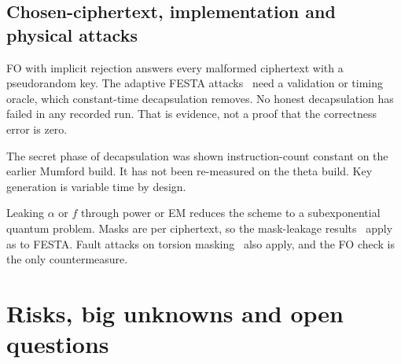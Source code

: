 \documentclass[11pt,a4paper]{article}
\begin{document}
\subsection{Chosen-ciphertext, implementation and physical attacks}
\begin{description}[style=nextline]
\item[Adaptive and decryption-failure attacks (derived).] FO with implicit
  rejection answers every malformed ciphertext with a pseudorandom key. The
  adaptive FESTA attacks~\cite{MO23} need a validation or timing oracle,
  which constant-time decapsulation removes. No honest decapsulation has
  failed in any recorded run. That is evidence, not a proof that the
  correctness error is zero.
\item[Timing (partly measured).] The secret phase of decapsulation was
  shown instruction-count constant on the earlier Mumford build. It has not
  been re-measured on the theta build. Key generation is variable time by
  design.
\item[Side channels beyond timing (open).] Leaking $\alpha$ or $f$ through
  power or EM reduces the scheme to a subexponential quantum problem.
  Masks are per ciphertext, so the mask-leakage results~\cite{DIKM25} apply
  as to FESTA. Fault attacks on torsion masking~\cite{GLM26} also apply, and
  the FO check is the only countermeasure.
\end{description}


\section{Risks, big unknowns and open questions}\label{sec:risks}
\end{document}
